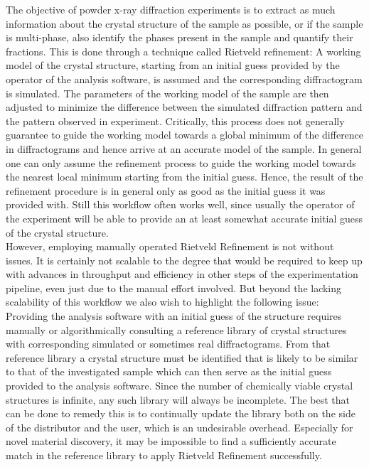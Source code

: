 

The objective of powder x-ray diffraction experiments is to extract as much information about the crystal structure
of the sample as possible, or if the sample is multi-phase, also identify the phases present in the sample and quantify
their fractions.
This is done through a technique called Rietveld refinement: A working model of the crystal structure, starting
from an initial guess provided by the operator of the analysis software, is assumed and the corresponding diffractogram
is simulated.
The parameters of the working model of the sample are then adjusted to minimize the difference between the simulated
diffraction pattern and the pattern observed in experiment.
Critically, this process does not generally guarantee to guide the working model towards a global minimum of the difference
in diffractograms and hence arrive at an accurate model of the sample.
In general one can only assume the refinement process to guide the working model towards the nearest local minimum
starting from the initial guess.
Hence, the result of the refinement procedure is in general only as good as the initial guess it was provided with.
Still this workflow often works well, since usually the operator of the experiment will be able
to provide an at least somewhat accurate initial guess of the crystal structure.\\

However, employing manually operated Rietveld Refinement is not without issues.
It is certainly not scalable to the degree that would be required to keep up with advances
in throughput and efficiency in other steps of the experimentation pipeline, even just due to the manual effort involved.
But beyond the lacking scalability of this workflow we also wish to highlight the following issue:
Providing the analysis software with an initial guess of the structure requires manually or algorithmically
consulting a reference library of crystal structures with corresponding simulated or sometimes real diffractograms.
From that reference library a crystal structure must be identified that is likely to be similar
to that of the investigated sample which can then serve as the initial guess provided to the analysis software.
Since the number of chemically viable crystal structures is infinite, any such library will always be incomplete.
The best that can be done to remedy this is to continually update the library both on the side
of the distributor and the user, which is an undesirable overhead.
Especially for novel material discovery, it may be impossible to find a sufficiently accurate match in the reference
library to apply Rietveld Refinement successfully.

